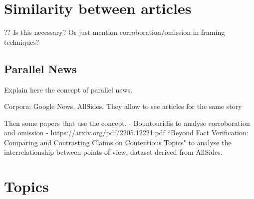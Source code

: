 













\section{Similarity between articles}
\label{sec:lit_relationships}

?? Is this necessary? Or just mention corroboration/omission in framing techniques?

\subsection{Parallel News}

Explain here the concept of parallel news.

Corpora: Google News, AllSides. They allow to see articles for the same story

Then some papers that use the concept.
- Bountouridis to analyse corroboration and omission
- https://arxiv.org/pdf/2205.12221.pdf ``Beyond Fact Verification: Comparing and Contrasting Claims on Contentious Topics" to analyse the interrelationship between points of view, dataset derived from AllSides.

\section{Topics}
\label{sec:lit_topics}


